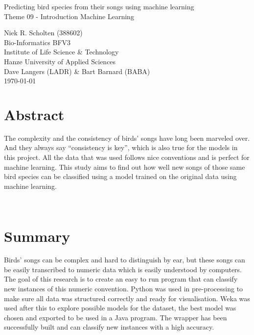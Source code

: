 \documentclass[
]{article}
\begin{document}
\begin{center}


    \Huge{Predicting bird species from their songs using machine learning}\\
    \vspace{\baselineskip}
    \LARGE{Theme 09 - Introduction Machine Learning}\\
    \vspace{\baselineskip}

\end{center}
\vspace{\baselineskip}

\normalsize
\vspace*{\fill}
\begin{flushright}
    Niek R. Scholten (388602)\\
    Bio-Informatics BFV3\\
    Institute of Life Science \& Technology\\
    Hanze University of Applied Sciences\\
    Dave Langers (LADR) \& Bart Barnard (BABA)\\
    \today
\end{flushright}
\newpage

\section*{Abstract}

The complexity and the consistency of birds' songs have long been marveled over.
And they always say ``consistency is key'', which is also true for the models in this project.
All the data that was used follows nice conventions and is perfect for machine learning.
This study aims to find out how well new songs of those same bird species can be classified using a model trained on the original data using machine learning.

\label{sec:abstract}~
\newpage

\section*{Summary}

Birds' songs can be complex and hard to distinguish by ear, but these songs can be easily transcribed to numeric data which is easily understood by computers.
The goal of this research is to create an easy to run program that can classify new instances of this numeric convention.
Python was used in pre-processing to make sure all data was structured correctly and ready for visualisation.
Weka was used after this to explore possible models for the dataset, the best model was chosen and exported to be used in a Java program.
The wrapper has been successfully built and can classify new instances with a high accuracy.
\end{document}
